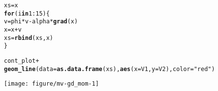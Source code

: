 \documentclass[a4paper]{article}
\makeatletter
\newcommand{\hlnum}[1]{\textcolor[rgb]{0.686,0.059,0.569}{#1}}%
\newcommand{\hlstr}[1]{\textcolor[rgb]{0.192,0.494,0.8}{#1}}%
\newcommand{\hlopt}[1]{\textcolor[rgb]{0,0,0}{#1}}%
\newcommand{\hlstd}[1]{\textcolor[rgb]{0.345,0.345,0.345}{#1}}%
\newcommand{\hlkwa}[1]{\textcolor[rgb]{0.161,0.373,0.58}{\textbf{#1}}}%
\newcommand{\hlkwb}[1]{\textcolor[rgb]{0.69,0.353,0.396}{#1}}%
\newcommand{\hlkwc}[1]{\textcolor[rgb]{0.333,0.667,0.333}{#1}}%
\newcommand{\hlkwd}[1]{\textcolor[rgb]{0.737,0.353,0.396}{\textbf{#1}}}%
\newenvironment{kframe}{%
 \def\at@end@of@kframe{}%
 \ifinner\ifhmode%
  \def\at@end@of@kframe{\end{minipage}}%
  \begin{minipage}{\columnwidth}%
 \fi\fi%
 \def\FrameCommand##1{\hskip\@totalleftmargin \hskip-\fboxsep
 \colorbox{shadecolor}{##1}\hskip-\fboxsep
     \hskip-\linewidth \hskip-\@totalleftmargin \hskip\columnwidth}%
 \MakeFramed {\advance\hsize-\width
   \@totalleftmargin\z@ \linewidth\hsize
   \@setminipage}}%
 {\par\unskip\endMakeFramed%
 \at@end@of@kframe}
\newenvironment{knitrout}{}{} %
\makeatother
\begin{document}
{\begin{enumerate}
\begin{knitrout}
\begin{kframe}
\begin{alltt}
\hlstd{xs} \hlkwb{=} \hlstd{x}
\hlkwa{for} \hlstd{(i} \hlkwa{in} \hlnum{1}\hlopt{:}\hlnum{15}\hlstd{)\{}
  \hlstd{v} \hlkwb{=} \hlstd{phi} \hlopt{*} \hlstd{v} \hlopt{-} \hlstd{alpha}\hlopt{*}\hlkwd{grad}\hlstd{(x)}
  \hlstd{x} \hlkwb{=} \hlstd{x} \hlopt{+} \hlstd{v}
  \hlstd{xs} \hlkwb{=} \hlkwd{rbind}\hlstd{(xs, x)}
\hlstd{\}}

\hlstd{cont_plot} \hlopt{+}
  \hlkwd{geom_line}\hlstd{(}\hlkwc{data} \hlstd{=} \hlkwd{as.data.frame}\hlstd{(xs),} \hlkwd{aes}\hlstd{(}\hlkwc{x}\hlstd{=V1,} \hlkwc{y}\hlstd{=V2),} \hlkwc{color}\hlstd{=}\hlstr{"red"}\hlstd{)}
\end{alltt}
\end{kframe}
\texttt{[image: figure/mv-gd\_mom-1]} 
\end{knitrout}


\end{enumerate}

}
\end{document}

